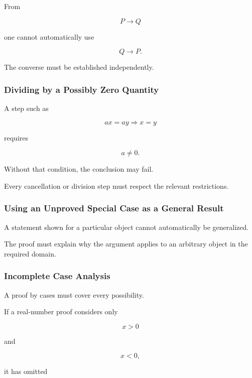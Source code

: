 From

\[ P\to Q \]

one cannot automatically use

\[ Q\to P. \]

The converse must be established independently.

\subsubsection{Dividing by a Possibly Zero Quantity}
\label{subsec:proof-error-zero-division}

A step such as

\[ ax=ay\Longrightarrow x=y \]

requires

\[ a\neq0. \]

Without that condition, the conclusion may fail.

Every cancellation or division step must respect the relevant restrictions.

\subsubsection{Using an Unproved Special Case as a General Result}
\label{subsec:proof-error-generalization}

A statement shown for a particular object cannot automatically be generalized.

The proof must explain why the argument applies to an arbitrary object in the
required domain.

\subsubsection{Incomplete Case Analysis}
\label{subsec:proof-error-cases}

A proof by cases must cover every possibility.

If a real-number proof considers only

\[ x>0 \]

and

\[ x<0, \]

it has omitted

